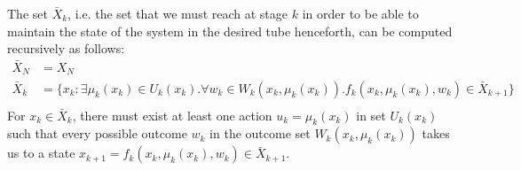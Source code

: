 \documentclass[11pt, oneside]{article}   	%
\begin{document}
The set $\bar{X}_k$, i.e. the set that we must reach at stage $k$ in order to be able to maintain the state of the system in the desired tube henceforth, can be computed recursively as follows:
\begin{align*}
\bar{X}_N &= X_N\\
\bar{X}_k &= \{x_k: \exists \mu_k(x_k) \in U_k(x_k).\forall w_k\in W_k(x_k,\mu_k(x_k)).f_k(x_k,\mu_k(x_k),w_k) \in \bar{X}_{k+1}\}\\
\end{align*}
For $x_k \in \bar{X}_k$, there must exist at least one action $u_k=\mu_k(x_k)$ in set $U_k(x_k)$ such that every possible outcome $w_k$ in the outcome set $W_k(x_k,\mu_k(x_k))$ takes us to a state $x_{k+1} = f_k(x_k,\mu_k(x_k),w_k) \in \bar{X}_{k+1}$.
\end{document}
